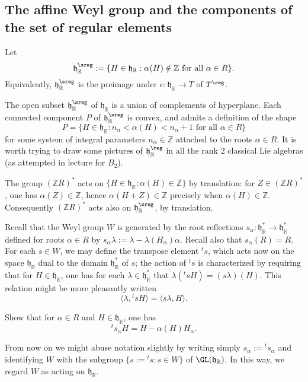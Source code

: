 \documentclass[reqno]{amsart} 
\begin{document}
\subsection{The affine Weyl group and the components of the set of regular elements\label{sec:affine-weyl-gp}}
\label{sec:org8dfce1f}
Let
\begin{equation*}
  \mathfrak{h}_\mathbb{R}^{\sreg} := \{H \in \mathfrak{h}_\mathbb{R} : \alpha(H) \notin \mathbb{Z} \text{ for all } \alpha \in R\}.
\end{equation*}
Equivalently, $\mathfrak{h}_\mathbb{R}^{\sreg}$ is the preimage under $e : \mathfrak{h}_\mathbb{R} \rightarrow T$ of $T^{\reg}$.

The open subset $\mathfrak{h}_\mathbb{R}^{\sreg}$ of $\mathfrak{h}_\mathbb{R}$ is a union of complements of hyperplane.  Each connected component $P$ of $\mathfrak{h}_\mathbb{R}^{\sreg}$ is convex, and admits a definition of the shape
\begin{equation*}
  P = \{H \in \mathfrak{h}_\mathbb{R} : n_\alpha < \alpha(H) < n_\alpha + 1 \text{ for all } \alpha \in R \}
\end{equation*}
for some system of integral parameters $n_\alpha \in \mathbb{Z}$ attached to the roots $\alpha \in R$.  It is worth trying to draw some pictures of $\mathfrak{h}_\mathbb{R}^{\reg}$ in all the rank $2$ classical Lie algebras (as attempted in lecture for $B_2$).

The group $(\mathbb{Z} R)^*$ acts on $\{H \in \mathfrak{h}_\mathbb{R} : \alpha(H) \in \mathbb{Z}\}$ by translation: for $Z \in (\mathbb{Z} R)^*$, one has $\alpha(Z) \in \mathbb{Z}$, hence $\alpha(H+Z) \in \mathbb{Z}$ precisely when $\alpha(H) \in \mathbb{Z}$.  Consequently $(\mathbb{Z} R)^*$ acts also on $\mathfrak{h}_\mathbb{R}^{\sreg}$, by translation.

Recall that the Weyl group $W$ is generated by the root reflections $s_\alpha : \mathfrak{h}_\mathbb{R}^* \rightarrow \mathfrak{h}_\mathbb{R}^*$ defined for roots $\alpha \in R$ by $s_\alpha \lambda := \lambda - \lambda(H_\alpha) \alpha$.  Recall also that $s_\alpha(R) = R$.  For each $s \in W$, we may define the transpose element ${}^t s$, which acts now on the space $\mathfrak{h}_\mathbb{R}$ dual to the domain $\mathfrak{h}_\mathbb{R}^*$ of $s$; the action of ${}^t s$ is characterized by requiring that for $H \in \mathfrak{h}_\mathbb{R}$, one has for each $\lambda \in \mathfrak{h}_\mathbb{R}^*$ that $\lambda({}^t s H) = (s \lambda)(H)$.  This relation might be more pleasantly written
\begin{equation*}
  \langle \lambda, {}^t s H \rangle = \langle s \lambda, H \rangle.
\end{equation*}
\begin{exercise}
  Show that for $\alpha \in R$ and $H \in \mathfrak{h}_\mathbb{R}$, one has
  \begin{equation*}
 {}^t s_\alpha H = H - \alpha(H) H_\alpha.
  \end{equation*}
\end{exercise}
From now on we might abuse notation slightly by writing simply $s_\alpha := {}^t s_\alpha$ and identifying $W$ with the subgroup $\{s := {}^t s : s \in W\}$ of $\GL(\mathfrak{h}_\mathbb{R})$.  In this way, we regard $W$ as acting on $\mathfrak{h}_\mathbb{R}$.
\end{document}
